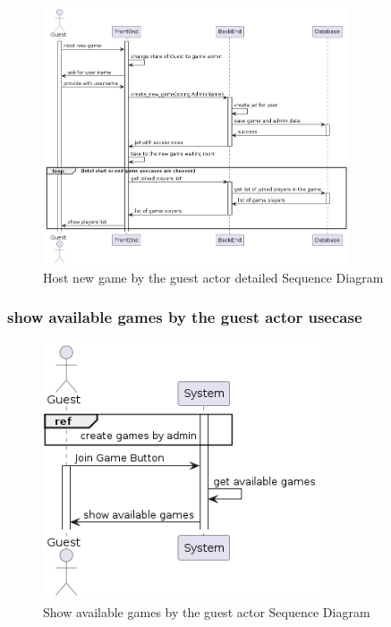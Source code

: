 \documentclass{article}
\begin{document}
 \begin{figure}[H]
	 \centering
	 \includegraphics[height=3in]{../thesis_tex/assets/diagrams/guest_host_game_detailedSD.png}
	 \caption{Host new game by the guest actor detailed Sequence Diagram}
\end{figure}

\subsubsection{show available games by the guest actor usecase}
 \begin{figure}[H]
	 \centering
	 \includegraphics[height=3in]{../thesis_tex/assets/diagrams/guest_show_available_games_SD.png}
	 \caption{Show available games by the guest actor Sequence Diagram}
\end{figure}
\end{document}
